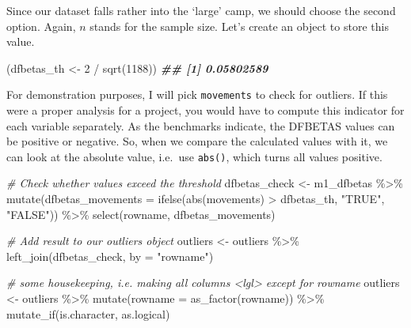 \documentclass[
]{book}
\newenvironment{Shaded}{\begin{snugshade}}{\end{snugshade}}
\newcommand{\AttributeTok}[1]{\textcolor[rgb]{0.77,0.63,0.00}{#1}}
\newcommand{\CommentTok}[1]{\textcolor[rgb]{0.56,0.35,0.01}{\textit{#1}}}
\newcommand{\DecValTok}[1]{\textcolor[rgb]{0.00,0.00,0.81}{#1}}
\newcommand{\DocumentationTok}[1]{\textcolor[rgb]{0.56,0.35,0.01}{\textbf{\textit{#1}}}}
\newcommand{\FunctionTok}[1]{\textcolor[rgb]{0.00,0.00,0.00}{#1}}
\newcommand{\NormalTok}[1]{#1}
\newcommand{\OtherTok}[1]{\textcolor[rgb]{0.56,0.35,0.01}{#1}}
\newcommand{\SpecialCharTok}[1]{\textcolor[rgb]{0.00,0.00,0.00}{#1}}
\newcommand{\StringTok}[1]{\textcolor[rgb]{0.31,0.60,0.02}{#1}}
\begin{document}
Since our dataset falls rather into the `large' camp, we should choose the second option. Again, \(n\) stands for the sample size. Let's create an object to store this value.

\begin{Shaded}
\begin{Highlighting}[]
\NormalTok{(dfbetas\_th }\OtherTok{\textless{}{-}} \DecValTok{2} \SpecialCharTok{/} \FunctionTok{sqrt}\NormalTok{(}\DecValTok{1188}\NormalTok{))}
\DocumentationTok{\#\# [1] 0.05802589}
\end{Highlighting}
\end{Shaded}

For demonstration purposes, I will pick \texttt{movements} to check for outliers. If this were a proper analysis for a project, you would have to compute this indicator for each variable separately. As the benchmarks indicate, the DFBETAS values can be positive or negative. So, when we compare the calculated values with it, we can look at the absolute value, i.e.~use \texttt{abs()}, which turns all values positive.

\begin{Shaded}
\begin{Highlighting}[]
\CommentTok{\# Check whether values exceed the threshold}
\NormalTok{dfbetas\_check }\OtherTok{\textless{}{-}}\NormalTok{ m1\_dfbetas }\SpecialCharTok{\%\textgreater{}\%}
  \FunctionTok{mutate}\NormalTok{(}\AttributeTok{dfbetas\_movements =} \FunctionTok{ifelse}\NormalTok{(}\FunctionTok{abs}\NormalTok{(movements) }\SpecialCharTok{\textgreater{}}\NormalTok{ dfbetas\_th,}
                                \StringTok{"TRUE"}\NormalTok{,}
                                \StringTok{"FALSE"}\NormalTok{)) }\SpecialCharTok{\%\textgreater{}\%}
  \FunctionTok{select}\NormalTok{(rowname, dfbetas\_movements)}

\CommentTok{\# Add result to our outliers object}
\NormalTok{outliers }\OtherTok{\textless{}{-}}\NormalTok{ outliers }\SpecialCharTok{\%\textgreater{}\%} \FunctionTok{left\_join}\NormalTok{(dfbetas\_check, }\AttributeTok{by =} \StringTok{"rowname"}\NormalTok{)}

\CommentTok{\# some housekeeping, i.e. making all columns \textless{}lgl\textgreater{} except for rowname}
\NormalTok{outliers }\OtherTok{\textless{}{-}}\NormalTok{ outliers }\SpecialCharTok{\%\textgreater{}\%}
  \FunctionTok{mutate}\NormalTok{(}\AttributeTok{rowname =} \FunctionTok{as\_factor}\NormalTok{(rowname)) }\SpecialCharTok{\%\textgreater{}\%}
  \FunctionTok{mutate\_if}\NormalTok{(is.character, as.logical)}
\end{Highlighting}
\end{Shaded}
\end{document}
